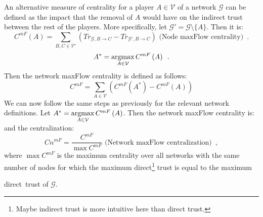     An alternative measure of centrality for a player $A \in \mathcal{V}$ of a network $\mathcal{G}$ can be defined as the
    impact that the removal of $A$ would have on the indirect trust between the rest of the players. More specifically, let
    $\mathcal{G}' = \mathcal{G} \setminus \{A\}$. Then it is:
    \begin{equation*}
      C^{mF}\left(A\right) = \sum\limits_{B,C \in \mathcal{V}'}\left(Tr_{\mathcal{G}, B \rightarrow C} - Tr_{\mathcal{G}', B
      \rightarrow C}\right) \mbox{ (Node maxFlow centrality)} \enspace.
    \end{equation*}
    \begin{equation*}
      A^* = \operatorname*{argmax}\limits_{A \in \mathcal{V}}C^{mF}\left(A\right) \enspace.
    \end{equation*}
    Then the network maxFlow centrality is defined as follows:
    \begin{equation*}
      C^{mF} = \sum\limits_{A \in \mathcal{V}}\left(C^{mF}\left(A^*\right) - C^{mF}\left(A\right)\right)
    \end{equation*}
    We can now follow the same steps as previously for the relevant network definitions. Let $A^* = \operatorname*{argmax}\limits_{A \in
    \mathcal{V}}C^{mF}\left(A\right)$. Then the network maxFlow centrality is:
    and the centralization:
    \begin{equation*}
      Cn^{mF} = \frac{C^{mF}}{\max C^{mF}} \mbox{ (Network maxFlow centralization)} \enspace,
    \end{equation*}
    where $\max C^{mF}$ is the maximum centrality over all networks with the same number of nodes for which the maximum
    direct\footnote{Maybe indirect trust is more intuitive here than direct trust.} trust is equal to the maximum
    \addtocounter{footnote}{-1} direct\footnotemark \ trust of $\mathcal{G}$.

    \noindent\hrulefill
    \newpage
